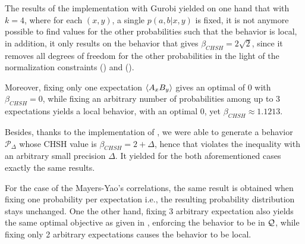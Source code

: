 The results of the implementation with Gurobi yielded on one hand that with $k =
4$, where for each $(x,y)$, a single $p(a,b|x,y)$ is fixed, it is not anymore
possible to find values for the other probabilities such that the behavior is
local, in addition, it only results on the behavior that gives $\beta_{CHSH} = 2
\sqrt 2$, since it removes all degrees of freedom for the other probabilities
in the light of the normalization constraints () and 
().

Moreover, fixing only one expectation $\braket{A_x B_y}$ gives an
optimal of 0 with $\beta_{CHSH} = 0$, while fixing an arbitrary number of 
probabilities among up to 3 expectations yields a local behavior, with an optimal
0, yet $\beta_{CHSH} \approx 1.1213$.

Besides, thanks to the implementation of , we were able to
generate a behavior $\mathcal P_{\Delta}$ whose CHSH value is $\beta_{CHSH} = 2
+ \Delta$, hence that violates the inequality with an arbitrary small precision 
$\Delta$. It yielded for the both aforementioned cases exactly the same results.

For the case of the Mayers-Yao's correlations, the same result is obtained when
fixing one probability per expectation i.e., the resulting probability distribution
stays unchanged. One the other hand, fixing 3 arbitrary expectation also yields 
the same optimal objective as given in , enforcing the 
behavior to be in $\mathcal{Q}$, while fixing only 2 arbitrary expectations causes the
behavior to be local.